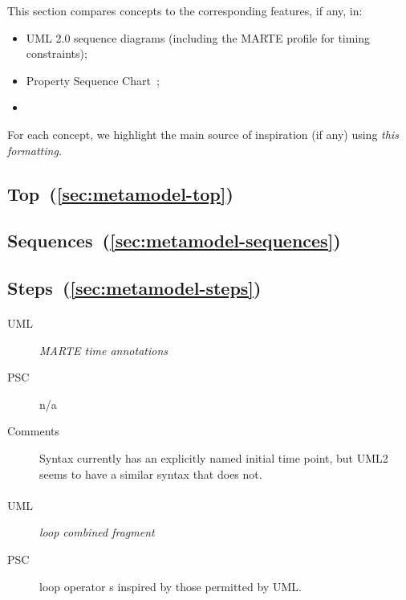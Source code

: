 \newcommand{\insp}[1]{\textsl{#1}}

This section compares \langname{} concepts to the
corresponding features, if any, in:

\begin{itemize}
\item
  UML 2.0 sequence diagrams (including the MARTE profile for timing
  constraints);
\item
  Property Sequence Chart~\cite{psc};
\item
\end{itemize}

For each concept, we highlight the main source of inspiration (if any)
using \insp{this formatting}.

\subsection{Top~(\ref{sec:metamodel-top})}

\subsection{Sequences~(\ref{sec:metamodel-sequences})}

\subsection{Steps~(\ref{sec:metamodel-steps})}

\paragraph{\mdeadlinestep}
\begin{description}
\item[UML] \insp{MARTE time annotations}
\item[PSC] n/a
\item[Comments]
  Syntax currently has an explicitly named initial time point, but UML2
  seems to have a similar syntax that does not.  
\end{description}
      
\paragraph{\mloopstep}
\begin{description}
\item[UML] \insp{loop combined fragment}
\item[PSC] loop operator
    \mloopbound s inspired by those permitted by UML.
\end{description}

